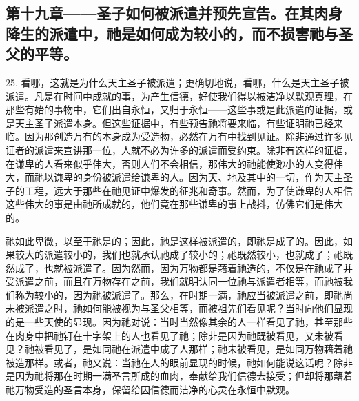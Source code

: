 
\subsection{第十九章——圣子如何被派遣并预先宣告。在其肉身降生的派遣中，祂是如何成为较小的，而不损害祂与圣父的平等。}

25. 看哪，这就是为什么天主圣子被派遣；更确切地说，看哪，什么是天主圣子被派遣。凡是在时间中成就的事，为产生信德，好使我们得以被洁净以默观真理，在那些有始的事物中，它们出自永恒，又归于永恒——这些事或是此派遣的证据，或是天主圣子派遣本身。但这些证据中，有些预告祂将要来临，有些证明祂已经来临。因为那创造万有的本身成为受造物，必然在万有中找到见证。除非通过许多见证者的派遣来宣讲那一位，人就不必为许多的派遣而受约束。除非有这样的证据，在谦卑的人看来似乎伟大，否则人们不会相信，那伟大的祂能使渺小的人变得伟大，而祂以谦卑的身份被派遣给谦卑的人。因为天、地及其中的一切，作为天主圣子的工程，远大于那些在祂见证中爆发的征兆和奇事。然而，为了使谦卑的人相信这些伟大的事是由祂所成就的，他们竟在那些谦卑的事上战抖，仿佛它们是伟大的。\par

祂如此卑微，以至于祂是的；因此，祂是这样被派遣的，即祂是成了的。因此，如果较大的派遣较小的，我们也就承认祂成了较小的；祂既然较小，也就成了；祂既然成了，也就被派遣了。因为然而，因为万物都是藉着祂造的，不仅是在祂成了并受派遣之前，而且在万物存在之前，我们就明认同一位祂与派遣者相等，而祂被我们称为较小的，因为祂被派遣了。那么，在时期一满，祂应当被派遣之前，即祂尚未被派遣之时，祂如何能被视为与圣父相等，而被祖先们看见呢？当时向他们显现的是一些天使的显现。因为祂对说：当时当然像其余的人一样看见了祂，甚至那些在肉身中把祂钉在十字架上的人也看见了祂；除非是因为祂既被看见，又未被看见？祂被看见了，是如同祂在派遣中成了人那样；祂未被看见，是如同万物藉着祂被造那样。或者，祂又说：当祂在人的眼前显现的时候，祂如何能说这话呢？除非是因为祂将那在时期一满圣言所成的血肉，奉献给我们信德去接受；但却将那藉着祂万物受造的圣言本身，保留给因信德而洁净的心灵在永恒中默观。\par

